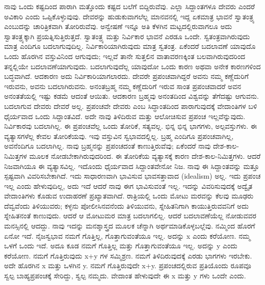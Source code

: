 ನಾವು ಒಂದು ಕಷ್ಟದಿಂದ ಪಾರಾಗಿ ಮತ್ತೊಂದು ಕಷ್ಟದ ಬಲೆಗೆ ಬಿದ್ದಿರುವೆವು. ಎಲ್ಲಾ ಸಿದ್ದಾಂತಗಳೂ ದೇವರು ಎಂದರೆ ಅವಿಕಾರಿ ಎಂದು ಒಪ್ಪಿಕೊಳ್ಳುವುವು. ದೇವರನ್ನು ಹುಡುಕುವಾಗಲೆಲ್ಲ ಮಾನವನಲ್ಲಿ ಇದ್ದ ಏಕಮಾತ್ರ ಭಾವನೆ ಸ್ವಾತಂತ್ರ್ಯ ಎಂಬುದನ್ನು ಚಾರಿತ್ರಿಕವಾಗಿ ತೋರಿರುವೆವು. ಅನ್ವೇಷಣೆ ಇನ್ನೂ ಅತಿ ಕೆಳಗಿನ ಮಟ್ಟದಲ್ಲಿರುವಾಗಲೂ ಅದು ಸ್ವಾತಂತ್ರ್ಯಕ್ಕಾಗಿ ಪ್ರಯತ್ನಿಸುತ್ತಿರುತ್ತದೆ. ಸ್ವಾತಂತ್ರ್ಯ ಮತ್ತು ನಿರ್ವಿಕಾರ ಭಾವನೆ ಎರಡೂ ಒಂದೇ. ಸ್ವತಂತ್ರವಾಗಿರುವುದು ಮಾತ್ರ ಎಂದಿಗೂ ಬದಲಾಗುವುದಿಲ್ಲ. ನಿರ್ವಿಕಾರಿಯಾಗಿರುವುದು ಮಾತ್ರ ಸ್ವತಂತ್ರ. ಏಕೆಂದರೆ ಬದಲಾವಣೆ ಯಾವುದೊ ಒಂದು ಹೊರಗಿನ ವಸ್ತುವಿನಿಂದ ಆಗುವುದು; ಇಲ್ಲವೆ ತಾನೇ ಸುತ್ತಲಿನ ವಾತಾವರಣಕ್ಕಿಂತ ಬಲವಾಗಿರುವುದರಿಂದ ತನ್ನಲ್ಲಿಯೇ ಬದಲಾವಣೆಯಾಗುವುದು. ಬದಲಾಗುವುದೆಲ್ಲ ಯಾವುದೋ ಒಂದು ಕಾರಣ ಅಥವಾ ಅನೇಕ ಕಾರಣಗಳಿಂದ ಬದ್ಧವಾಗಿದೆ. ಆದಕಾರಣ ಅದು ನಿರ್ವಿಕಾರಿಯಾಗಲಾರದು. ದೇವರೇ ಪ್ರಪಂಚವಾಗಿದ್ದರೆ ಅವನು ನಮ್ಮ ಕಣ್ಣೆದುರಿಗೆ ಇರುವನು, ಅವನು ಬದಲಾಗಿರುವನು. ಅನಂತಬ್ರಹ್ಮ ನಮ್ಮ ಕಣ್ಣೆದುರಿಗೆ ಇರುವ ಸಾಂತ ಪ್ರಪಂಚವಾದರೆ ಅವನ ಅನಂತತೆಯಲ್ಲಿ ಇಷ್ಟು ಕಡಮೆ ಆದಂತೆ ಆಯಿತು. ಆದಕಾರಣ ಬ್ರಹ್ಮವು ಅನಂತದಿಂದ ವಿಶ್ವವನ್ನು ತೆಗೆದಷ್ಟು ಆಗುವನು. ಬದಲಾಗುವ ದೇವರು ದೇವರೆ ಅಲ್ಲ. ಪ್ರಪಂಚವೇ ದೇವರು ಎಂಬ ಸಿದ್ಧಾಂತದಿಂದ ಪಾರಾಗುವುದಕ್ಕೆ ವೇದಾಂತಿಗಳ ಬಳಿ ಧೈರ್ಯವಾದ ಒಂದು ಸಿದ್ದಾಂತವಿದೆ. ಅದೇ ನಾವು ತಿಳಿದಿರುವ ಮತ್ತು ಆಲೋಚಿಸುವ ಪ್ರಪಂಚ ಇಲ್ಲವೆನ್ನುವುದು. ನಿರ್ವಿಕಾರವು ಬದಲಾಗಿಲ್ಲ. ಈ ಪ್ರಪಂಚವೆಲ್ಲ ಒಂದು ತೋರಿಕೆ, ಸತ್ಯವಲ್ಲ. ಭಿನ್ನ ಭಿನ್ನ ಭಾಗಗಳು, ಅಲ್ಪವಸ್ತುಗಳು. ಈ ವ್ಯತ್ಯಾಸಗಳೆಲ್ಲ ಕೇವಲ ತೋರಿಕೆಯವು. ಇವು ವಸ್ತುವಿನ ಸ್ವಭಾವದಲ್ಲಿಲ್ಲ. ಬ್ರಹ್ಮ ಎಂದಿಗೂ ಪ್ರಪಂಚವಾಗಿಲ್ಲ, ಅವನೆಂದಿಗೂ ಬದಲಾಗಿಲ್ಲ. ನಾವು ಬ್ರಹ್ಮನನ್ನು ಪ್ರಪಂಚದಂತೆ ಕಾಣುತ್ತಿರುವೆವು; ಏಕೆಂದರೆ ನಾವು ದೇಶ-ಕಾಲ-ನಿಮಿತ್ತಗಳ ಮೂಲಕ ನೋಡಬೇಕಾಗಿರುವುದರಿಂದ. ಈ ತೋರಿಕೆಯ ವ್ಯತ್ಯಾಸಕ್ಕೆ ಕಾರಣ ದೇಶ-ಕಾಲ-\-ನಿಮಿತ್ತಗಳು. ಆದರೆ ನಿಜವಾಗಿಯೂ ಈ ವ್ಯತ್ಯಾಸವಿಲ್ಲ. ಇದೊಂದು ಧೈರ್ಯವಾದ ಸಿದ್ದಾಂತವೇನೋ ನಿಜ. ನಾವು ಈ ಸಿದ್ದಾಂತವನ್ನು ಮತ್ತೂ ಸ್ಪಷ್ಟವಾಗಿ ವಿವರಿಸಬೇಕಾಗಿದೆ. ಇದು ಸಾಧಾರಣವಾಗಿ ಭಾವಿಸುವ ಭಾವಸತ್ತಾವಾದ (idealism) ಅಲ್ಲ. ಇದು ಪ್ರಪಂಚ ಇಲ್ಲ ಎಂದು ಹೇಳುವುದಿಲ್ಲ, ಅದು ಇದೆ ಆದರೆ ನಾವು ಈಗ ಭಾವಿಸುವಂತೆ ಇಲ್ಲ. ಇದನ್ನು ವಿವರಿಸುವುದಕ್ಕೆ ಅದ್ವೈತ ವೇದಾಂತಿಗಳು ಕೊಡುವ ಉದಾಹರಣೆ ಪ್ರಖ್ಯಾತವಾಗಿದೆ. ರಾತ್ರಿಯಲ್ಲಿ ಒಂದು ಮೋಟು ಮರವನ್ನು ಕೆಲವು ಮೂಢರು ದೆವ್ವವೆಂದು ತಿಳಿಯುವರು; ಕಳ್ಳನು ಪೋಲೀಸಿನವನೆಂದು ತಿಳಿಯುವನು, ಸ್ನೇಹಿತನಿಗಾಗಿ ಕಾಯುತ್ತಿರುವವನಿಗೆ ಅದು ಸ್ನೇಹಿತನಂತೆ ಕಾಣುವುದು. ಆದರೆ ಆ ಮೋಟುಮರ ಮಾತ್ರ ಬದಲಾಗಲಿಲ್ಲ. ಆದರೆ ಬದಲಾವಣೆಯೆಲ್ಲ ನೋಡುವವರ ಮನಸ್ಸಿನಲ್ಲಿ ಆದದ್ದು. ನಾವು ಇದನ್ನು ಮನಶ್ಶಾಸ್ತ್ರದ ಮೂಲಕ ಚೆನ್ನಾಗಿ ಅರ್ಥಮಾಡಿಕೊಳ್ಳಬಲ್ಲೆವು. ನಮ್ಮಿಂದ ಹೊರಗೆ ಏನೋ ಇದೆ. ನೈಜಸ್ವಭಾವ ನಮಗೆ ಗೊತ್ತಿಲ್ಲ, ಗೊತ್ತಾಗುವಂತೆಯೂ ಇಲ್ಲ. ಅದನ್ನು x ಎಂದು ಕರೆಯೋಣ. ನಮ್ಮ ಒಳಗೆ ಒಂದು ಇದೆ. ಅದೂ ಕೂಡ ನಮಗೆ ಗೊತ್ತಿಲ್ಲ ಮತ್ತು ಗೊತ್ತಾಗುವಂತೆಯೂ ಇಲ್ಲ. ಅದನ್ನು y ಎಂದು ಕರೆಯೋಣ. ನಮಗೆ ಗೊತ್ತಿರುವುದು x+y ಗಳ ಸಮ್ಮಿಶ್ರಣ. ನಮಗೆ ತಿಳಿದಿರುವುದಕ್ಕೆ ಎರಡು ಭಾಗಗಳು ಇರಬೇಕು. ಅದೇ ಹೊರಗಿನ x ಮತ್ತು ಒಳಗಿನ y. ನಮಗೆ ಗೊತ್ತಿರುವುದೇ x+y. ಪ್ರಪಂಚದಲ್ಲಿರುವ ಪ್ರತಿಯೊಂದು ರೂಪವೂ ಸ್ವಲ್ಪ ಬಾಹ್ಯಪ್ರಪಂಚಕ್ಕೆ ಸೇರಿದ್ದು, ಸ್ವಲ್ಪ ನಮ್ಮದು. ವೇದಾಂತ ಹೇಳುವುದೇ ಈ x ಮತ್ತು y ಗಳು ಒಂದೇ ಎಂದು.

